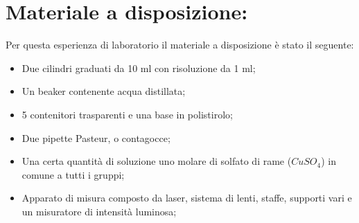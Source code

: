 \section{Materiale a disposizione:}

Per questa esperienza di laboratorio il materiale a disposizione è stato il seguente:
\begin{itemize}
	\item{Due cilindri graduati da 10 $\si{\milli\litre}$ con risoluzione da 1 $\si{\milli\litre}$;}
    \item{Un beaker contenente acqua distillata;}
	\item{5 contenitori trasparenti e una base in polistirolo;}
	\item{Due pipette Pasteur, o contagocce;}
	\item{Una certa quantità di soluzione uno molare di solfato di rame ($CuSO_4$) in comune a tutti i gruppi;}
	\item{Apparato di misura composto da laser, sistema di lenti, staffe, supporti vari e un misuratore di intensità luminosa;}
\end{itemize}
